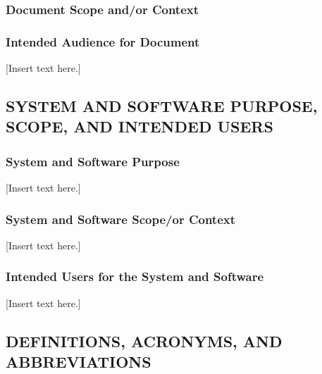 \documentclass[twoside,letterpaper]{article}
\begin{document}
\subsubsection{Document Scope and/or Context}
{\color{black}

}

\subsubsection{Intended Audience for Document}
{\color{black}
[Insert text here.]}

\subsection[SYSTEM AND SOFTWARE PURPOSE, SCOPE, AND INTENDED
USERS]{\bfseries\color{black} SYSTEM AND
SOFTWARE PURPOSE, SCOPE, AND INTENDED USERS}


\subsubsection{System and Software Purpose}
{\color{black}
[Insert text here.]}

\subsubsection[System and Software Scope/or Context]{System and Software
Scope/or Context}
{\color{black}
[Insert text here.]}

\subsubsection{Intended Users for the System and Software}
{\color{black}
[Insert text here.]}

\subsection[DEFINITIONS, ACRONYMS, AND
ABBREVIATIONS]{\bfseries\color{black}
DEFINITIONS, ACRONYMS, AND ABBREVIATIONS}



\bigskip
\end{document}
